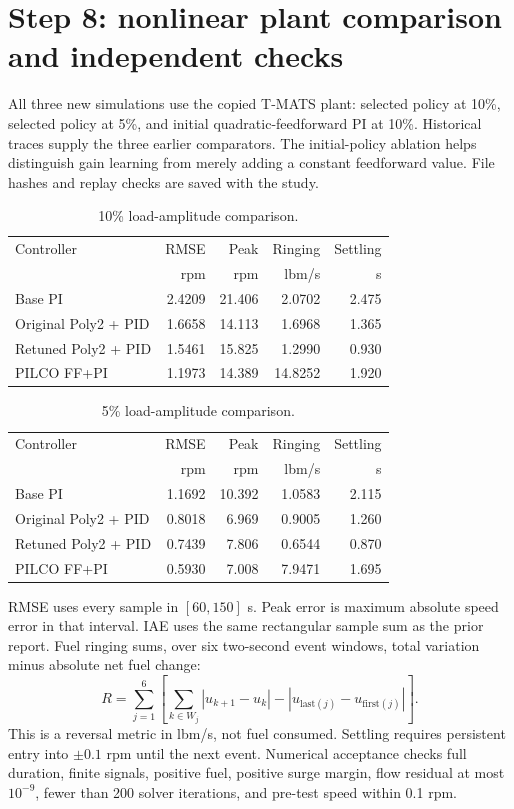\section{Step 8: nonlinear plant comparison and independent checks}
All three new simulations use the copied T-MATS plant: selected policy at 10\%, selected policy at 5\%, and initial quadratic-feedforward PI at 10\%. Historical traces supply the three earlier comparators. The initial-policy ablation helps distinguish gain learning from merely adding a constant feedforward value. File hashes and replay checks are saved with the study.

\begin{table}[H]\centering\small\begin{tabular}{lrrrr}\toprule Controller & RMSE & Peak & Ringing & Settling\\ & rpm & rpm & lbm/s & s\\\midrule
Base PI & 2.4209 & 21.406 & 2.0702 & 2.475 \\
Original Poly2 + PID & 1.6658 & 14.113 & 1.6968 & 1.365 \\
Retuned Poly2 + PID & 1.5461 & 15.825 & 1.2990 & 0.930 \\
PILCO FF+PI & 1.1973 & 14.389 & 14.8252 & 1.920 \\\bottomrule\end{tabular}\caption{10\% load-amplitude comparison.}\end{table}
\begin{table}[H]\centering\small\begin{tabular}{lrrrr}\toprule Controller & RMSE & Peak & Ringing & Settling\\ & rpm & rpm & lbm/s & s\\\midrule
Base PI & 1.1692 & 10.392 & 1.0583 & 2.115 \\
Original Poly2 + PID & 0.8018 & 6.969 & 0.9005 & 1.260 \\
Retuned Poly2 + PID & 0.7439 & 7.806 & 0.6544 & 0.870 \\
PILCO FF+PI & 0.5930 & 7.008 & 7.9471 & 1.695 \\\bottomrule\end{tabular}\caption{5\% load-amplitude comparison.}\end{table}

RMSE uses every sample in $[60,150]$ s. Peak error is maximum absolute speed error in that interval. IAE uses the same rectangular sample sum as the prior report. Fuel ringing sums, over six two-second event windows, total variation minus absolute net fuel change:
\begin{equation}
 R=\sum_{j=1}^{6}\left[\sum_{k\in W_j}|u_{k+1}-u_k|-|u_{\mathrm{last}(j)}-u_{\mathrm{first}(j)}|\right].
\end{equation}
This is a reversal metric in lbm/s, not fuel consumed. Settling requires persistent entry into $\pm0.1$ rpm until the next event. Numerical acceptance checks full duration, finite signals, positive fuel, positive surge margin, flow residual at most $10^{-9}$, fewer than 200 solver iterations, and pre-test speed within 0.1 rpm.

